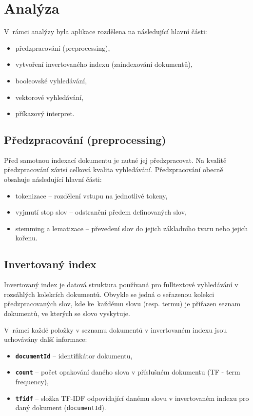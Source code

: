 \documentclass[
11pt,
a4paper,
pdftex,
czech,
titlepage
]{report}
\begin{document}
\chapter{Analýza}
V~rámci analýzy byla aplikace rozdělena na následující hlavní části:
\begin{itemize}
    \item předzpracování (preprocessing),
    \item vytvoření invertovaného indexu (zaindexování dokumentů),
    \item booleovské vyhledávání,
    \item vektorové vyhledávání,
    \item příkazový interpret.
\end{itemize}

\section{Předzpracování (preprocessing)}\label{analyza_preprocess}
Před samotnou indexací dokumentu je nutné jej předzpracovat. Na kvalitě předzpracování závisí celková kvalita vyhledávání. Předzpracování obecně obsahuje následující hlavní části:

\begin{itemize}
    \item tokenizace -- rozdělení vstupu na jednotlivé tokeny,
    \item vyjmutí stop slov -- odstranění předem definovaných slov,
    \item stemming a lematizace -- převedení slov do jejich základního tvaru nebo jejich kořenu.
\end{itemize}


\section{Invertovaný index}\label{inv_index_analyza}
Invertovaný index je datová struktura používaná pro fulltextové vyhledávání v rozsáhlých kolekcích dokumentů. Obvykle se jedná o seřazenou kolekci předzpracovaných slov, kde ke~každému slovu (resp. termu) je přiřazen seznam dokumentů, ve kterých se slovo vyskytuje.

V~rámci každé položky v seznamu dokumentů v invertovaném indexu jsou uchovávány další informace: 
\begin{itemize}
    \item \texttt{\textbf{documentId}} -- identifikátor dokumentu,
    \item \texttt{\textbf{count}} -- počet opakování daného slova v příslušném dokumentu (TF - term frequency),
    \item \texttt{\textbf{tfidf}} -- složka TF-IDF odpovídající danému slovu v invertovaném indexu pro daný dokument (\texttt{documentId}).
\end{itemize}
\end{document}
